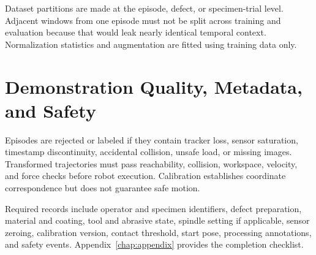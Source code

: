 Dataset partitions are made at the episode, defect, or specimen-trial level. Adjacent windows from one episode must not be split across training and evaluation because that would leak nearly identical temporal context. Normalization statistics and augmentation are fitted using training data only.

\section{Demonstration Quality, Metadata, and Safety}
Episodes are rejected or labeled if they contain tracker loss, sensor saturation, timestamp discontinuity, accidental collision, unsafe load, or missing images. Transformed trajectories must pass reachability, collision, workspace, velocity, and force checks before robot execution. Calibration establishes coordinate correspondence but does not guarantee safe motion.

Required records include operator and specimen identifiers, defect preparation, material and coating, tool and abrasive state, spindle setting if applicable, sensor zeroing, calibration version, contact threshold, start pose, processing annotations, and safety events. Appendix~\ref{chap:appendix} provides the completion checklist.
